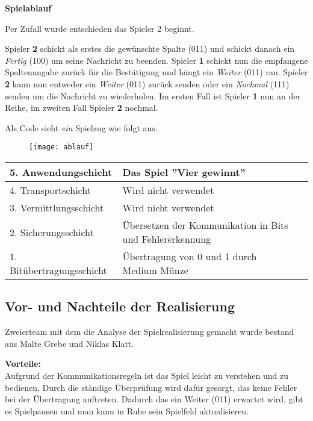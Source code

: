 \documentclass{scrartcl}
\begin{document}
  \newpage
  \textbf{Spielablauf}
  
  Per Zufall wurde entschieden das Spieler 2 beginnt.
  
  Spieler \textbf{2} schickt als erstes die gewünschte Spalte (011) und schickt danach ein \textit{Fertig} (100) um seine Nachricht zu beenden. Spieler \textbf{1} schickt nun die empfangene Spaltenangabe zurück für die Bestätigung und hängt ein \textit{Weiter} (011) ran. Spieler \textbf{2} kann nun entweder ein \textit{Weiter} (011) zurück senden oder ein  \textit{Nochmal} (111) senden um die Nachricht zu wiederholen. Im ersten Fall ist Spieler \textbf{1} nun an der Reihe, im zweiten Fall Spieler \textbf{2} nochmal. 
  
  Als Code sieht \emph{ein} Spielzug wie folgt aus.
  
  \begin{figure}[htbp]
  \texttt{[image: ablauf]}
    \end{figure}
    
  
    \begin{tabular}{l|ll}
      5. Anwendungschicht & Das Spiel ''Vier gewinnt'' \\ \hline
      4. Transportschicht & Wird nicht verwendet \\ \hline
      3. Vermittlungsschicht & Wird nicht verwendet \\ \hline
      2. Sicherungsschicht & Übersetzen der Kommunikation in Bits und Fehlererkennung \\ \hline
      1. Bitübertragungsschicht & Übertragung von 0 und 1 durch Medium Münze\\ 
     \end{tabular}

 \subsection[Aufgabe 4 Vor- und Nachteile der Realisierung]{Vor- und Nachteile der Realisierung}

Zweierteam mit dem die Analyse der Spielrealisierung gemacht wurde bestand aus Malte Grebe und Niklas Klatt. 
 
 \textbf{Vorteile:}\\
 Aufgrund der Kommunikationsregeln ist das Spiel leicht zu verstehen und zu bedienen. Durch die ständige Überprüfung wird dafür gesorgt, das keine Fehler bei der Übertragung auftreten. Dadurch das ein Weiter (011) erwartet wird, gibt es Spielpausen und man kann in Ruhe sein Spielfeld aktualisieren. 
 
\end{document}
